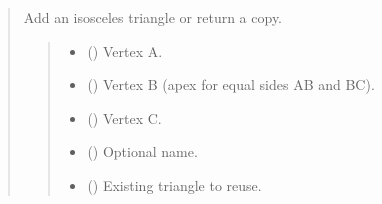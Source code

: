 \documentclass[letterpaper,10pt,english]{sphinxmanual}
\begin{document}
\begin{quote}
\begin{fulllineitems}
\begin{fulllineitems}
\label{\detokenize{pygeox:pygeox.add_objects.AddNamespace.isosceles_triangle}}
\pysigstartsignatures
\pysiglinewithargsret
{}
{\sphinxparamcomma {}\sphinxparamcomma {}\sphinxparamcomma {}\sphinxparamcomma {}}
{}
\pysigstopsignatures
\sphinxAtStartPar
Add an isosceles triangle or return a copy.
\begin{quote}\begin{description}
\begin{itemize}
\item {} 
\sphinxAtStartPar
{} (\sphinxstyleliteralemphasis{\sphinxupquote{ | }}) \textendash{} Vertex A.

\item {} 
\sphinxAtStartPar
{} (\sphinxstyleliteralemphasis{\sphinxupquote{ | }}) \textendash{} Vertex B (apex for equal sides AB and BC).

\item {} 
\sphinxAtStartPar
{} (\sphinxstyleliteralemphasis{\sphinxupquote{ | }}) \textendash{} Vertex C.

\item {} 
\sphinxAtStartPar
{} (\sphinxstyleliteralemphasis{\sphinxupquote{ | }}) \textendash{} Optional name.

\item {} 
\sphinxAtStartPar
{} (\sphinxstyleliteralemphasis{\sphinxupquote{ | }}) \textendash{} Existing triangle to reuse.


\end{itemize}
\end{description}
\end{quote}
\end{fulllineitems}
\end{fulllineitems}
\end{quote}
\end{document}
